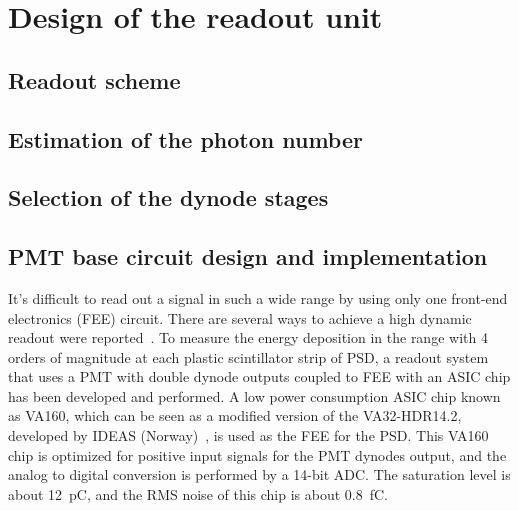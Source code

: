 \documentclass[5p, times]{elsarticle}
\begin{document}

\section{Design of the readout unit}
\label{sec:design}

\subsection{Readout scheme}

\subsection{Estimation of the photon number}

\subsection{Selection of the dynode stages}

\subsection{PMT base circuit design and implementation}

It's difficult to read out a signal in such a wide range by using only one front-end electronics (FEE) circuit. 
There are several ways to achieve a high dynamic readout were reported~\cite{katayose2008development,kampert1994high,zhang2012high}. 
To measure the energy deposition in the range with 4 orders of magnitude at each plastic scintillator strip of PSD, a readout system that uses a PMT with double dynode outputs coupled to FEE with an ASIC chip has been developed and performed. 
A low power consumption ASIC chip known as VA160, which can be seen as a modified version of the VA32-HDR14.2, developed by IDEAS (Norway)~\cite{va160}, is used as the FEE for the PSD. 
This VA160 chip is optimized for positive input signals for the PMT dynodes output, and the analog to digital conversion is performed by a 14-bit ADC. 
The saturation level is about \SI{12}{\pico\coulomb}, and the RMS noise of this chip is about \SI{0.8}{\femto\coulomb}.
\end{document}
